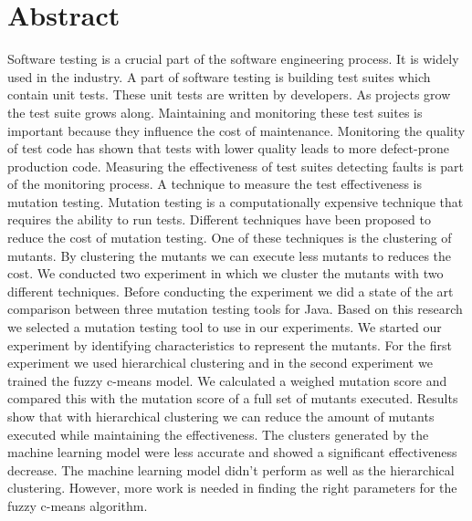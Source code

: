 \documentclass[../main]{subfiles}
\begin{document}
\chapter*{Abstract}
Software testing is a crucial part of the software engineering process. 
It is widely used in the industry.
A part of software testing is building test suites which contain unit tests.
These unit tests are written by developers. 
As projects grow the test suite grows along.
Maintaining and monitoring these test suites is important because they influence the cost of maintenance.
Monitoring the quality of test code has shown that tests with lower quality leads to more defect-prone production code.
Measuring the effectiveness of test suites detecting faults is part of the monitoring process.
A technique to measure the test effectiveness is mutation testing.
Mutation testing is a computationally expensive technique that requires the ability to run tests.
Different techniques have been proposed to reduce the cost of mutation testing.
One of these techniques is the clustering of mutants.
By clustering the mutants we can execute less mutants to reduces the cost.
We conducted two experiment in which we cluster the mutants with two different techniques.
Before conducting the experiment we did a state of the art comparison between three mutation testing tools for Java.
Based on this research we selected a mutation testing tool to use in our experiments.
\newline
We started our experiment by identifying characteristics to represent the mutants.
For the first experiment we used hierarchical clustering and in the second experiment we trained the fuzzy c-means model.
We calculated a weighed mutation score and compared this with the mutation score of a full set of mutants executed.
Results show that with hierarchical clustering we can reduce the amount of mutants executed while maintaining the effectiveness.
The clusters generated by the machine learning model were less accurate and showed a significant effectiveness decrease.
The machine learning model didn't perform as well as the hierarchical clustering.
However, more work is needed in finding the right parameters for the fuzzy c-means algorithm. 
\end{document}
